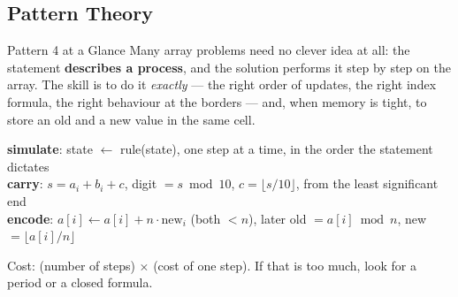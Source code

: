 \subsection{Pattern Theory}
\label{ssec:ch1-p4-theory}

\begin{patternbox}{Pattern 4 at a Glance}
Many array problems need no clever idea at all: the statement \textbf{describes a process}, and the solution performs it step by step on the array. The skill is to do it \emph{exactly} --- the right order of updates, the right index formula, the right behaviour at the borders --- and, when memory is tight, to store an old and a new value in the same cell.

\begin{center}
\end{center}

\begin{recurrencebox}
\centering
\textbf{simulate}: state $\leftarrow$ rule(state), one step at a time, in the order the statement dictates\\[3pt]
\textbf{carry}: $s = a_i + b_i + c$,\; digit $= s \bmod 10$,\; $c = \lfloor s/10 \rfloor$,\; from the least significant end\\[3pt]
\textbf{encode}: $a[i] \leftarrow a[i] + n\cdot \text{new}_i$ \;(both $< n$),\; later old $= a[i] \bmod n$, new $= \lfloor a[i]/n \rfloor$
\end{recurrencebox}
Cost: (number of steps) $\times$ (cost of one step). If that is too much, look for a period or a closed formula.
\end{patternbox}

